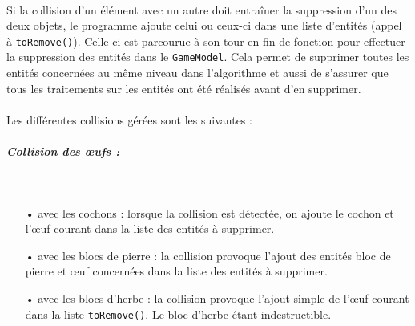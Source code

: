 \documentclass[a4paper,12pt]{report}
\begin{document}
\paragraph{}Si la collision d'un élément avec un autre doit entraîner la suppression d'un des deux objets, le programme ajoute celui ou ceux-ci dans une liste d'entités (appel à \verb+toRemove()+). Celle-ci est parcourue à son tour en fin de fonction pour effectuer la suppression des entités dans le \verb+GameModel+. Cela permet de supprimer toutes les entités concernées au même niveau dans l'algorithme et aussi de s'assurer que tous les traitements sur les entités ont été réalisés avant d'en supprimer.

\paragraph{}Les différentes collisions gérées sont les suivantes :

\subparagraph{Collision des œufs :}
~\\
\begin{itemize}
\item[•] avec les cochons : lorsque la collision est détectée, on ajoute le cochon et l'œuf courant dans la liste des entités à supprimer.
\item[•] avec les blocs de pierre : la collision provoque l'ajout des entités bloc de pierre et œuf concernées dans la liste des entités à supprimer.
\item[•] avec les blocs d'herbe : la collision provoque l'ajout simple de l’œuf courant dans la liste \verb+toRemove()+. Le bloc d'herbe étant indestructible.
\end{itemize}
\end{document}
